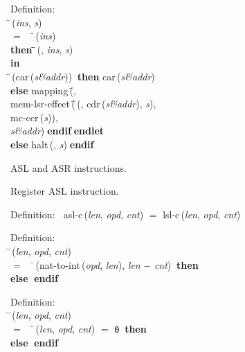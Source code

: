 \begin{tabbing}{\sc Definition}: \\  
\=\,({\it{ins\/}}, {\it{s\/}}) \\ 
$=$$\;\;\;\;$\=\,({\it{ins\/}}) \\ 
{\bf then }\=\=\,({}, {\it{ins\/}}, {\it{s\/}})\- \\ 
{\bf in} \\ 
\=\,({\rm{car}}\,({\it{s\&addr\/}}))$\;\;${\bf then }{\rm{car}}\,({\it{s\&addr\/}}) \\ 
{\bf else }{\rm{mapping}}\,(\=, \\ 
{\rm{mem-lsr-effect}}\,(\=\,({}, {\rm{cdr}}\,({\it{s\&addr\/}}), {\it{s\/}}), \\ 
{\rm{mc-ccr}}\,({\it{s\/}}))\-, \\ 
{\it{s\&addr\/}})\-$\;${\bf  endif}\-$\;${\bf  endlet}\- \\ 
{\bf else }{\rm{halt}}\,({}, {\it{s\/}})$\;${\bf  endif}\-\-
\end{tabbing}
                
 ASL and ASR instructions.

 Register ASL instruction.
\begin{tabbing}{\sc Definition}:$\;\;$
{\rm{asl-c}}\,({\it{len\/}}, {\it{opd\/}}, {\it{cnt\/}}) $=$ {\rm{lsl-c}}\,({\it{len\/}}, {\it{opd\/}}, {\it{cnt\/}})
\end{tabbing}

\begin{tabbing}{\sc Definition}: \\  
\=\,({\it{len\/}}, {\it{opd\/}}, {\it{cnt\/}}) \\ 
$=$$\;\;\;\;$\=\,({\rm{nat-to-int}}\,({\it{opd\/}}, {\it{len\/}}), {\it{len\/}} $-$ {\it{cnt\/}})$\;\;${\bf then }{} \\ 
{\bf else }{}$\;${\bf  endif}\-\-
\end{tabbing}

\begin{tabbing}{\sc Definition}: \\  
\=\,({\it{len\/}}, {\it{opd\/}}, {\it{cnt\/}}) \\ 
$=$$\;\;\;\;$\=\,({\it{len\/}}, {\it{opd\/}}, {\it{cnt\/}}) $=$ {\tt{0}}$\;\;${\bf then }{} \\ 
{\bf else }{}$\;${\bf  endif}\-\-
\end{tabbing}

